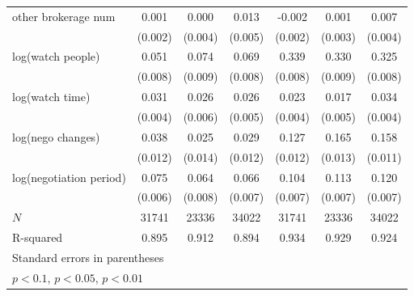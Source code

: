 {\begin{adjustbox}{max width=\textwidth}
\begin{tabular}{l*{6}{c}}
other brokerage num  &       0.001         &       0.000         &       0.013\sym{**} &      -0.002         &       0.001         &       0.007\sym{*}  \\
            &     (0.002)         &     (0.004)         &     (0.005)         &     (0.002)         &     (0.003)         &     (0.004)         \\
\addlinespace
log(watch people)&       0.051\sym{***}&       0.074\sym{***}&       0.069\sym{***}&       0.339\sym{***}&       0.330\sym{***}&       0.325\sym{***}\\
            &     (0.008)         &     (0.009)         &     (0.008)         &     (0.008)         &     (0.009)         &     (0.008)         \\
\addlinespace
log(watch time)&       0.031\sym{***}&       0.026\sym{***}&       0.026\sym{***}&       0.023\sym{***}&       0.017\sym{***}&       0.034\sym{***}\\
            &     (0.004)         &     (0.006)         &     (0.005)         &     (0.004)         &     (0.005)         &     (0.004)         \\
\addlinespace
log(nego changes)&       0.038\sym{***}&       0.025\sym{*}  &       0.029\sym{**} &       0.127\sym{***}&       0.165\sym{***}&       0.158\sym{***}\\
            &     (0.012)         &     (0.014)         &     (0.012)         &     (0.012)         &     (0.013)         &     (0.011)         \\
\addlinespace
log(negotiation period)&       0.075\sym{***}&       0.064\sym{***}&       0.066\sym{***}&       0.104\sym{***}&       0.113\sym{***}&       0.120\sym{***}\\
            &     (0.006)         &     (0.008)         &     (0.007)         &     (0.007)         &     (0.007)         &     (0.007)         \\
\midrule
\(N\)       &       31741         &       23336         &       34022         &       31741         &       23336         &       34022         \\
R-squared   &       0.895         &       0.912         &       0.894         &       0.934         &       0.929         &       0.924         \\
\bottomrule
\multicolumn{7}{l}{\footnotesize Standard errors in parentheses}\\
\multicolumn{7}{l}{\footnotesize \sym{*} \(p<0.1\), \sym{**} \(p<0.05\), \sym{***} \(p<0.01\)}\\
\end{tabular}
\end{adjustbox}
}
